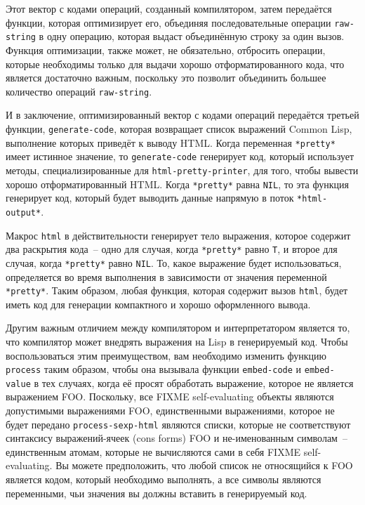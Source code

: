 Этот вектор с кодами операций, созданный компилятором, затем передаётся функции, которая
оптимизирует его, объединяя последовательные операции \lstinline{raw-string} в одну операцию,
которая выдаст объединённую строку за один вызов. Функция оптимизации, также может, не
обязательно, отбросить операции, которые необходимы только для выдачи хорошо
отформатированного кода, что является достаточно важным, поскольку это позволит объединить
большее количество операций \lstinline{raw-string}.

И в заключение, оптимизированный вектор с кодами операций передаётся третьей функции,
\lstinline{generate-code}, которая возвращает список выражений Common Lisp, выполнение которых
приведёт к выводу HTML.  Когда переменная \lstinline{*pretty*} имеет истинное значение, то
\lstinline{generate-code} генерирует код, который использует методы, специализированные для
\lstinline{html-pretty-printer}, для того, чтобы вывести хорошо отформатированный HTML. Когда
\lstinline{*pretty*} равна \lstinline{NIL}, то эта функция генерирует код, который будет выводить
данные напрямую в поток \lstinline{*html-output*}.

Макрос \lstinline{html} в действительности генерирует тело выражения, которое содержит два
раскрытия кода~-- одно для случая, когда \lstinline{*pretty*} равно \lstinline{T}, и второе для
случая, когда \lstinline{*pretty*} равно \lstinline{NIL}.  То, какое выражение будет использоваться,
определяется во время выполнения в зависимости от значения переменной \lstinline{*pretty*}.
Таким образом, любая функция, которая содержит вызов \lstinline{html}, будет иметь код для
генерации компактного и хорошо оформленного вывода.

Другим важным отличием между компилятором и интерпретатором является то, что компилятор
может внедрять выражения на Lisp в генерируемый код.  Чтобы воспользоваться этим
преимуществом, вам необходимо изменить функцию \lstinline{process} таким образом, чтобы она
вызывала функции \lstinline{embed-code} и \lstinline{embed-value} в тех случаях, когда её просят
обработать выражение, которое не является выражением FOO. Поскольку, все FIXME
self-evaluating объекты являются допустимыми выражениями FOO, единственными выражениями,
которое не будет передано \lstinline{process-sexp-html} являются списки, которые не
соответствуют синтаксису выражений-ячеек (cons forms) FOO и не-именованным
символам~-- единственным атомам, которые не вычисляются сами в себя FIXME
self-evaluating.  Вы можете предположить, что любой список не относящийся к FOO является
кодом, который необходимо выполнять, а все символы являются переменными, чьи значения вы
должны вставить в генерируемый код.

